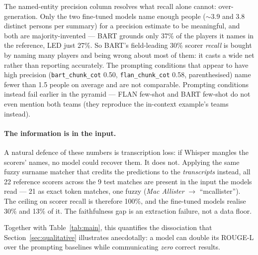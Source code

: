 \documentclass[10pt,a4paper]{article}
\begin{document}
The named-entity precision column resolves what recall alone cannot: over-generation. Only the two fine-tuned models name enough people ($\sim$3.9 and 3.8 distinct persons per summary) for a precision estimate to be meaningful, and both are majority-invented --- BART grounds only 37\% of the players it names in the reference, LED just 27\%. So BART's field-leading 30\% scorer \emph{recall} is bought by naming many players and being wrong about most of them: it casts a wide net rather than reporting accurately. The prompting conditions that appear to have high precision (\texttt{bart\_chunk\_cot} 0.50, \texttt{flan\_chunk\_cot} 0.58, parenthesised) name fewer than 1.5 people on average and are not comparable. Prompting conditions instead fail earlier in the pyramid --- FLAN few-shot and BART few-shot do not even mention both teams (they reproduce the in-context example's teams instead).

\paragraph{The information is in the input.}
A natural defence of these numbers is transcription loss: if Whisper mangles the scorers' names, no model could recover them. It does not. Applying the same fuzzy surname matcher that credits the predictions to the \emph{transcripts} instead, all 22 reference scorers across the 9 test matches are present in the input the models read --- 21 as exact token matches, one fuzzy (\emph{Mac Allister} $\to$ ``mcallister''). The ceiling on scorer recall is therefore 100\%, and the fine-tuned models realise 30\% and 13\% of it. The faithfulness gap is an extraction failure, not a data floor.

Together with Table~\ref{tab:main}, this quantifies the dissociation that Section~\ref{sec:qualitative} illustrates anecdotally: a model can double its ROUGE-L over the prompting baselines while communicating \emph{zero} correct results.
\end{document}
